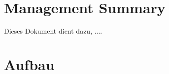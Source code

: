 \documentclass[12pt,a4paper,german]{article}
\author{Nicolas Mauchle}
\begin{document}
%

\tableofcontents
%
\newpage

\section{Management Summary}
Dieses Dokument dient dazu, ....

\section{Aufbau}

\section{}
\end{document}
